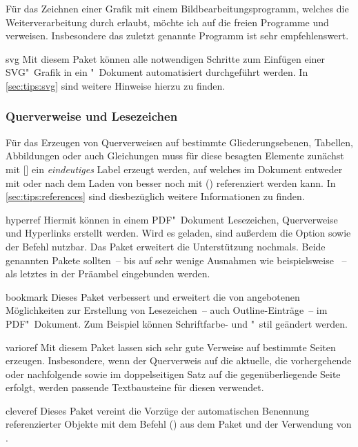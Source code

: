 Für das Zeichnen einer Grafik mit einem Bildbearbeitungsprogramm, welches die 
Weiterverarbeitung durch  erlaubt, möchte ich auf die freien 
Programme  und  verweisen. 
Insbesondere das zuletzt genannte Programm ist sehr empfehlenswert. 
%
\begin{packages}
\item[svg]
  Mit diesem Paket können alle notwendigen Schritte zum Einfügen einer 
  SVG"~Grafik in ein "~Dokument automatisiert durchgeführt 
  werden. In \autoref{sec:tips:svg} sind weitere Hinweise hierzu zu finden.
\end{packages}
%


\subsubsection{Querverweise und Lesezeichen}
%
%
%
Für das Erzeugen von Querverweisen auf bestimmte Gliederungsebenen, Tabellen, 
Abbildungen oder auch Gleichungen muss für diese besagten Elemente zunächst mit 
[] ein \emph{eindeutiges} Label erzeugt werden, 
auf welches im Dokument entweder mit  oder nach dem Laden von 
 besser noch mit () 
referenziert werden kann. In \autoref{sec:tips:references} sind diesbezüglich 
weitere Informationen zu finden.
%
\begin{packages}
\item[hyperref]
  Hiermit können in einem PDF"~Dokument Lesezeichen, Querverweise und 
  Hyperlinks erstellt werden. Wird es geladen, sind außerdem die Option 
   sowie der Befehl  nutzbar. Das 
  Paket  erweitert die Unterstützung nochmals. Beide 
  genannten Pakete sollten~-- bis auf sehr wenige Ausnahmen wie beispielsweise 
  ~-- als letztes in der Präambel eingebunden werden.
\item[bookmark]
  Dieses Paket verbessert und erweitert die von  angebotenen 
  Möglichkeiten zur Erstellung von Lesezeichen~-- auch Outline-Einträge~-- im 
  PDF"~Dokument. Zum Beispiel können Schriftfarbe- und "~stil geändert werden.
\item[varioref]
  Mit diesem Paket lassen sich sehr gute Verweise auf bestimmte Seiten 
  erzeugen. Insbesondere, wenn der Querverweis auf die aktuelle, die 
  vorhergehende oder nachfolgende sowie im doppelseitigen Satz auf die 
  gegenüberliegende Seite erfolgt, werden passende Textbausteine für diesen 
  verwendet.
\item[cleveref]
  Dieses Paket vereint die Vorzüge der automatischen Benennung referenzierter 
  Objekte mit dem Befehl () aus dem Paket 
   und der Verwendung von .
\end{packages}
%
%


